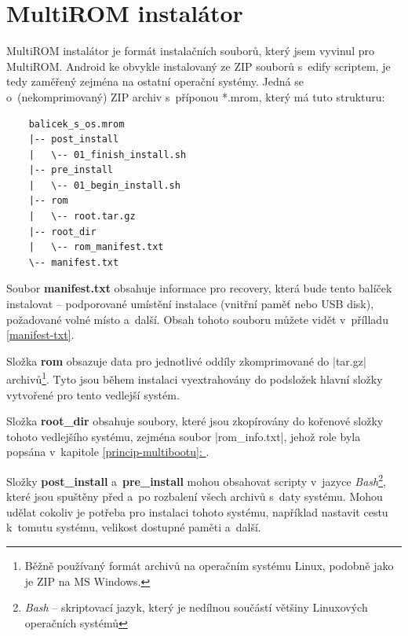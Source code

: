\documentclass[12pt, a4paper, oneside]{article}
\newcommand{\B}{\textbf} %
\newcommand{\It}{\textit}  %
\newcommand*{\fullref}[1]{\hyperref[{#1}]{\ref*{#1}: \uv{\nameref*{#1}}}}
\begin{document}
\section*{MultiROM instalátor}
\label{sec:installer}
MultiROM instalátor je formát instalačních souborů, který jsem vyvinul pro MultiROM. Android ke obvykle instalovaný ze ZIP souborů s~edify scriptem, je tedy zaměřený zejména na ostatní operační systémy. Jedná se o~(nekomprimovaný) ZIP archiv s~příponou *.mrom, který má tuto strukturu:
\begin{verbatim}
    balicek_s_os.mrom
    |-- post_install
    |   \-- 01_finish_install.sh
    |-- pre_install
    |   \-- 01_begin_install.sh
    |-- rom
    |   \-- root.tar.gz
    |-- root_dir
    |   \-- rom_manifest.txt
    \-- manifest.txt
\end{verbatim}

Soubor \B{manifest.txt} obsahuje informace pro recovery, která bude tento balíček instalovat -- podporované umístění instalace (vnitřní paměť nebo USB disk), požadované volné místo a~další. Obsah tohoto souboru můžete vidět v~přílladu \ref{manifest-txt}.

Složka \B{rom} obsazuje data pro jednotlivé oddíly zkomprimované do |tar.gz| archivů\footnote{Běžně používaný formát archivů na operačním systému Linux, podobně jako je ZIP na MS Windows.}. Tyto jsou během instalaci vyextrahovány do podsložek hlavní složky vytvořené pro tento vedlejší systém.

Složka \B{root\_dir} obsahuje soubory, které jsou zkopírovány do kořenové složky tohoto vedlejšího systému, zejména soubor |rom_info.txt|, jehož role byla popsána v~kapitole \fullref{princip-multibootu}.

Složky \B{post\_install} a~\B{pre\_install} mohou obsahovat scripty v~jazyce \It{Bash}\footnote{\It{Bash} -- skriptovací jazyk, který je nedílnou součástí většiny Linuxových operačních systémů}, které jsou spuštěny před a~po rozbalení všech archivů s~daty systému. Mohou udělat cokoliv je potřeba pro instalaci tohoto systému, například nastavit cestu k~tomutu systému, velikost dostupné paměti a~další.
\end{document}
